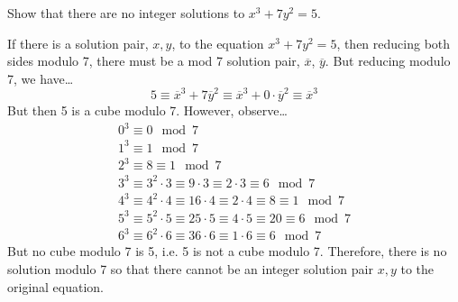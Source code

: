 \documentclass[11pt,letterpaper]{article}
\begin{document}
\newpage



 Show that there are no integer solutions to $x^3 + 7y^2= 5$. \pspace

\sol If there is a solution pair, $x, y$, to the equation $x^3 + 7y^2= 5$, then reducing both sides modulo 7, there must be a mod 7 solution pair, $\overline{x}$, $\overline{y}$. But reducing modulo 7, we have\dots
	\[
	5 \equiv \overline{x}^3 + 7 \overline{y}^2 \equiv \overline{x}^3 + 0 \cdot \overline{y}^2 \equiv \overline{x}^3
	\]
But then 5 is a cube modulo 7. However, observe\dots
	\[
	\begin{aligned}
	0^3 \equiv 0 \mod 7 \\
	1^3 \equiv 1 \mod 7 \\
	2^3 \equiv 8 \equiv 1 \mod 7 \\
	3^3 \equiv 3^2 \cdot 3 \equiv 9 \cdot 3 \equiv 2 \cdot 3 \equiv 6 \mod 7 \\
	4^3 \equiv 4^2 \cdot 4 \equiv 16 \cdot 4 \equiv 2 \cdot 4 \equiv 8 \equiv 1 \mod 7 \\
	5^3 \equiv 5^2 \cdot 5 \equiv 25 \cdot 5 \equiv 4 \cdot 5 \equiv 20 \equiv 6 \mod 7 \\
	6^3 \equiv 6^2 \cdot 6 \equiv 36 \cdot 6 \equiv 1 \cdot 6 \equiv 6 \mod 7
	\end{aligned}
	\]
But no cube modulo 7 is 5, i.e. 5 is not a cube modulo 7. Therefore, there is no solution modulo 7 so that there cannot be an integer solution pair $x, y$ to the original equation. 
\end{document}
